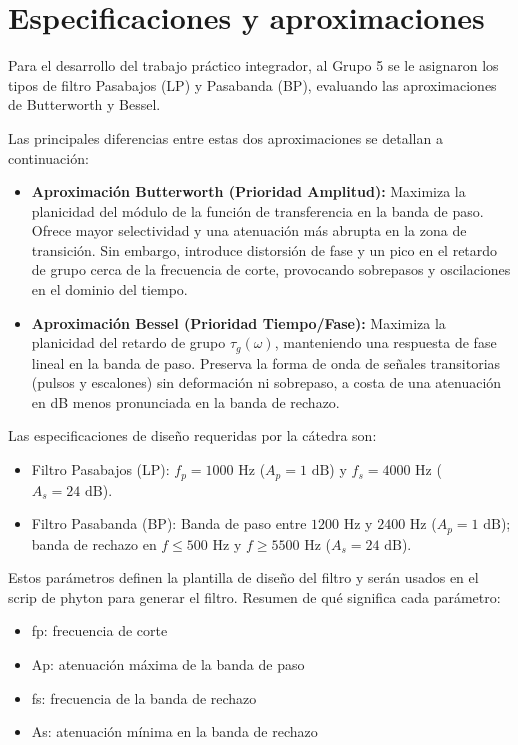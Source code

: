 \documentclass[12pt]{article}
\begin{document}
\section{Especificaciones y aproximaciones}
Para el desarrollo del trabajo práctico integrador, al Grupo 5 se le asignaron los tipos de filtro Pasabajos (LP) y Pasabanda (BP), evaluando las aproximaciones de Butterworth y Bessel.

Las principales diferencias entre estas dos aproximaciones se detallan a continuación:

\begin{itemize}
    \item \textbf{Aproximación Butterworth (Prioridad Amplitud):} Maximiza la planicidad del módulo de la función de transferencia en la banda de paso. Ofrece mayor selectividad y una atenuación más abrupta en la zona de transición. Sin embargo, introduce distorsión de fase y un pico en el retardo de grupo cerca de la frecuencia de corte, provocando sobrepasos y oscilaciones en el dominio del tiempo.
    \item \textbf{Aproximación Bessel (Prioridad Tiempo/Fase):} Maximiza la planicidad del retardo de grupo $\tau_g(\omega)$, manteniendo una respuesta de fase lineal en la banda de paso. Preserva la forma de onda de señales transitorias (pulsos y escalones) sin deformación ni sobrepaso, a costa de una atenuación en dB menos pronunciada en la banda de rechazo.
\end{itemize}



Las especificaciones de diseño requeridas por la cátedra son:
\begin{itemize}
    \item Filtro Pasabajos (LP): $f_p = 1000\text{ Hz}$ ($A_p = 1\text{ dB}$) y $f_s = 4000\text{ Hz}$ ($A_s = 24\text{ dB}$).
    \item Filtro Pasabanda (BP): Banda de paso entre $1200\text{ Hz}$ y $2400\text{ Hz}$ ($A_p = 1\text{ dB}$); banda de rechazo en $f \le 500\text{ Hz}$ y $f \ge 5500\text{ Hz}$ ($A_s = 24\text{ dB}$).
\end{itemize}

Estos parámetros definen la plantilla de diseño del filtro y serán usados en el scrip de phyton para generar el filtro. Resumen de qué significa cada parámetro:

\begin{itemize}
    \item fp: frecuencia de corte
    \item Ap: atenuación máxima de la banda de paso
    \item fs: frecuencia de la banda de rechazo
    \item As: atenuación mínima en la banda de rechazo
\end{itemize}
\end{document}
